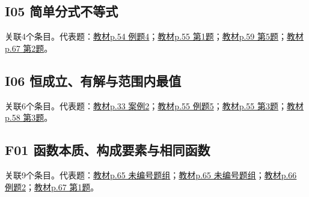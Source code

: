\par\medskip\noindent\begin{minipage}{\linewidth}\subsection{I05 简单分式不等式}关联4个条目。代表题：\hyperref[XJ-B1-C02-EX-P054-Y1398]{教材p.54 例题4}；\hyperref[XJ-B1-C02-PR-P055-Y1064]{教材p.55 第1题}；\hyperref[XJ-B1-C02-HW-P059-Y0410]{教材p.59 第5题}；\hyperref[XJ-B1-C03-PR-P067-Y1075]{教材p.67 第2题}。\end{minipage}\par
\par\medskip\noindent\begin{minipage}{\linewidth}\subsection{I06 恒成立、有解与范围内最值}关联6个条目。代表题：\hyperref[XJ-B1-C02-CA-P033-Y0951]{教材p.33 案例2}；\hyperref[XJ-B1-C02-EX-P055-Y0177]{教材p.55 例题5}；\hyperref[XJ-B1-C02-PR-P055-Y1260]{教材p.55 第3题}；\hyperref[XJ-B1-C02-HW-P058-Y1395]{教材p.58 第3题}。\end{minipage}\par
\par\medskip\noindent\begin{minipage}{\linewidth}\subsection{F01 函数本质、构成要素与相同函数}关联9个条目。代表题：\hyperref[XJ-B1-C03-TH-P065-Y0594]{教材p.65 未编号题组}；\hyperref[XJ-B1-C03-TH-P065-Y1561]{教材p.65 未编号题组}；\hyperref[XJ-B1-C03-EX-P066-Y1436]{教材p.66 例题2}；\hyperref[XJ-B1-C03-PR-P067-Y0874]{教材p.67 第1题}。\end{minipage}\par
